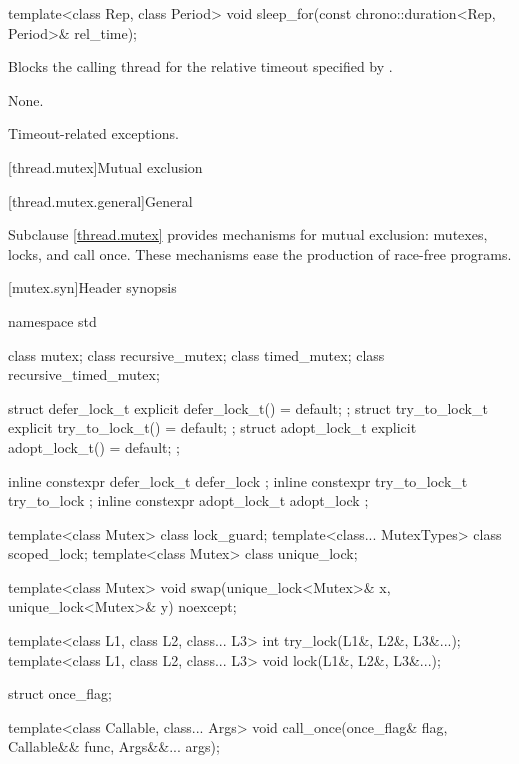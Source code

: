 %
\begin{itemdecl}
template<class Rep, class Period>
  void sleep_for(const chrono::duration<Rep, Period>& rel_time);
\end{itemdecl}

\begin{itemdescr}
\pnum
{}%
\effects
Blocks the calling thread for the relative timeout specified
by .

\pnum
\sync
None.

\pnum
\throws
Timeout-related exceptions.
\end{itemdescr}

[thread.mutex]{Mutual exclusion}

[thread.mutex.general]{General}

\pnum
Subclause \ref{thread.mutex} provides mechanisms for mutual exclusion: mutexes, locks, and call
once. These mechanisms ease the production of race-free
programs.

[mutex.syn]{Header  synopsis}

%
\begin{codeblock}
namespace std {
  class mutex;
  class recursive_mutex;
  class timed_mutex;
  class recursive_timed_mutex;

  struct defer_lock_t { explicit defer_lock_t() = default; };
  struct try_to_lock_t { explicit try_to_lock_t() = default; };
  struct adopt_lock_t { explicit adopt_lock_t() = default; };

  inline constexpr defer_lock_t  defer_lock { };
  inline constexpr try_to_lock_t try_to_lock { };
  inline constexpr adopt_lock_t  adopt_lock { };

  template<class Mutex> class lock_guard;
  template<class... MutexTypes> class scoped_lock;
  template<class Mutex> class unique_lock;

  template<class Mutex>
    void swap(unique_lock<Mutex>& x, unique_lock<Mutex>& y) noexcept;

  template<class L1, class L2, class... L3> int try_lock(L1&, L2&, L3&...);
  template<class L1, class L2, class... L3> void lock(L1&, L2&, L3&...);

  struct once_flag;

  template<class Callable, class... Args>
    void call_once(once_flag& flag, Callable&& func, Args&&... args);
}
\end{codeblock}

